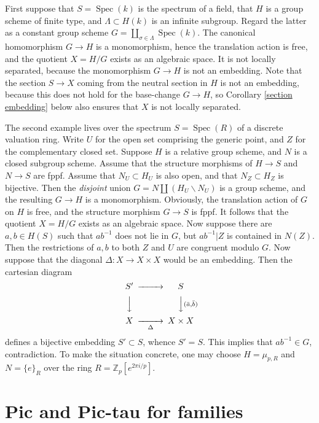 \documentclass[oneside, 12pt]{amsart}
\newcommand\mylabel[1]{\label{#1}\marginpar{\raggedright\vspace{-1ex}\medskip\medskip\footnotesize \tt #1}}
\renewcommand\mylabel[1]{\label{#1}}
\theoremstyle{definition}
\theoremstyle{remark}
\newcommand{\ZZ}{\mathbb{Z}}
\newcommand{\ra}{\rightarrow}
\newcommand{\Spec}{\operatorname{Spec}}
\begin{document}
First suppose that $S=\Spec(k)$ is the spectrum of a field, that $H$ is a group scheme of finite type,
and $\Lambda\subset H(k)$ is   an infinite  subgroup. Regard the latter  as a constant group scheme $G=\amalg_{\sigma\in \Lambda} \Spec(k)$.
The canonical homomorphism $G\ra H$ is   a monomorphism, hence the translation action is free,
and the quotient $X=H/G$ exists as an algebraic space. It is not locally separated, because 
the monomorphism $G\ra H$ is not an embedding. 
Note that the  section $S\ra X$ coming from the neutral section in $H$ is not
an embedding, because this does not hold for the  base-change $G\ra H$, so  Corollary \ref{section embedding} below also ensures that 
$X$ is not locally separated. 
 
The second example lives over the spectrum $S=\Spec(R)$  of a discrete valuation ring. Write $U$ for the open set comprising the generic point,
and $Z$ for the complementary closed set.
Suppose $H$ is a relative  group scheme,
and $N$ is a closed subgroup scheme. Assume that the structure morphisms of $H\ra S$ and $N\ra S$ are fppf.   
Assume  that  $N_U\subset H_U$ is also open, and that $N_Z\subset H_Z$ is bijective.
Then the \emph{disjoint} union $G=N\amalg   (H_U\smallsetminus N_U)$ is a group scheme, and   the resulting    $G\ra H$ is a monomorphism. 
Obviously, the translation action of $G$ on $H$ is free,
and the structure morphism $G\ra S$ is fppf. It follows that the quotient $X=H/G$ exists as an algebraic space.
Now suppose there are $a,b\in H(S)$ such that $ab^{-1}$ does not lie in $G$, but $ab^{-1}|Z$ is  contained in $N(Z)$.
Then the restrictions of $a,b$ to both $Z$ and $U$ are congruent modulo  $G$. 
Now suppose that the diagonal $\Delta: X\ra X\times X$ would be an embedding. Then the cartesian diagram
$$
\begin{CD}
S'   @>>>    S\\
@VVV        @VV(\bar{a},\bar{b})V\\
X   @>>\Delta>    X\times X
\end{CD}
$$
defines a bijective embedding $S'\subset S$, whence $S'=S$.
This implies that $ab^{-1}\in G$, contradiction.
To make the situation concrete, one may choose $H=\mu_{p,R}$ and $N=\{e\}_R$ over the ring   $R=\ZZ_p[e^{2\pi i/p}]$.


\section{Pic and Pic-tau for families}
\mylabel{Pic and tau}
 
\end{document}
